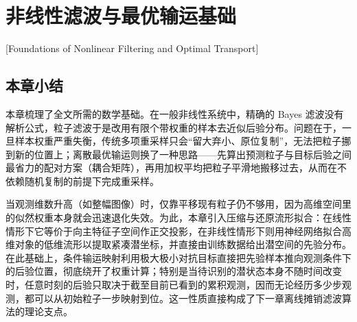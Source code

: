 \chapter{非线性滤波与最优输运基础}[Foundations of Nonlinear Filtering and Optimal Transport]








\section{本章小结}

本章梳理了全文所需的数学基础。在一般非线性系统中，精确的 Bayes 滤波没有解析公式，粒子滤波于是改用有限个带权重的样本去近似后验分布。问题在于，一旦样本权重严重失衡，传统多项重采样只会“留大弃小、原位复制”，无法把粒子挪到新的位置上；离散最优输运则换了一种思路——先算出预测粒子与目标后验之间最省力的配对方案（耦合矩阵），再用加权平均把粒子平滑地搬移过去，从而在不依赖随机复制的前提下完成重采样。

当观测维数升高（如整幅图像）时，仅靠平移现有粒子仍不够用，因为高维空间里的似然权重本身就会迅速退化失效。为此，本章引入压缩与还原流形拟合：在线性情形下它等价于向主特征子空间作正交投影，在非线性情形下则用神经网络拟合高维对象的低维流形以提取紧凑潜坐标，并直接由训练数据给出潜空间的先验分布。在此基础上，条件输运映射利用极大极小对抗目标直接把先验样本推向观测条件下的后验位置，彻底绕开了权重计算；特别是当待识别的潜状态本身不随时间改变时，任意时刻的后验只取决于截至目前已看到的累积观测，因而无论经历多少步观测，都可以从初始粒子一步映射到位。这一性质直接构成了下一章离线摊销滤波算法的理论支点。
